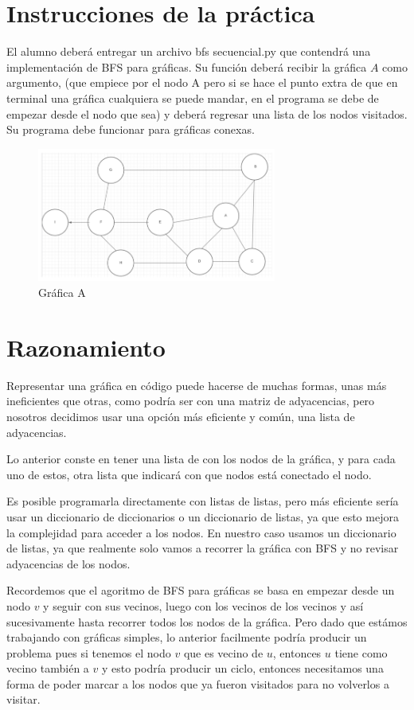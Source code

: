 
\section*{Instrucciones de la práctica}
El alumno deberá entregar un archivo bfs secuencial.py que contendrá una implementación de BFS para gráficas. Su función deberá recibir la gráfica \(A\) como argumento, (que empiece por el nodo A pero si se hace el punto extra de que en terminal una gráfica cualquiera se puede mandar, en
el programa se debe de empezar desde el nodo que sea) y deberá regresar una lista de los nodos visitados.
Su programa debe funcionar para gráficas conexas.

\begin{figure}[h]
	\centering
	\includegraphics[width=0.7\textwidth]{images/gA.png}
	\caption[grafica A]{Gráfica A}
\end{figure}

\section*{Razonamiento}
Representar una gráfica en código puede hacerse de muchas formas, unas más ineficientes que otras, como podría ser con una matriz de adyacencias, pero nosotros decidimos usar una opción más eficiente y común, una lista de adyacencias.

Lo anterior conste en tener una lista de con los nodos de la gráfica, y para cada uno de estos, otra lista que indicará con que nodos está conectado el nodo. 

Es posible programarla directamente con listas de listas, pero más eficiente sería usar un diccionario de diccionarios o un diccionario de listas, ya que esto mejora la complejidad para acceder a los nodos. En nuestro caso usamos un diccionario de listas, ya que realmente solo vamos a recorrer la gráfica con BFS y no revisar adyacencias de los nodos. 

Recordemos que el agoritmo de BFS para gráficas se basa en empezar desde un nodo \(v\) y seguir con sus vecinos, luego con los vecinos de los vecinos y así sucesivamente hasta recorrer todos los nodos de la gráfica. Pero dado que estámos trabajando con gráficas simples, lo anterior facilmente podría producir un problema pues si tenemos el nodo \(v\) que es vecino de \(u\), entonces \(u\) tiene como vecino también a \(v\) y esto podría producir un ciclo, entonces necesitamos una forma de poder marcar a los nodos que ya fueron visitados para no volverlos a visitar.

